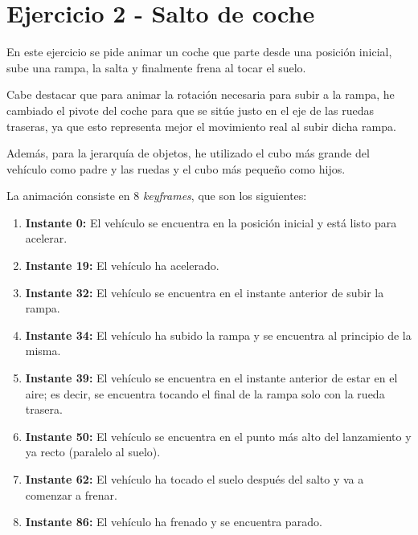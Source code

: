 \documentclass{article}
\begin{document}
\newpage

\section{Ejercicio 2 - Salto de coche}

En este ejercicio se pide animar un coche que parte desde una posición inicial, sube una rampa, la salta y finalmente frena al tocar el suelo.

\bigskip

Cabe destacar que para animar la rotación necesaria para subir a la rampa, he cambiado el pivote del coche para que se sitúe justo en el eje de las ruedas traseras, ya que esto representa mejor el movimiento real al subir dicha rampa.

\bigskip

Además, para la jerarquía de objetos, he utilizado el cubo más grande del vehículo como padre y las ruedas y el cubo más pequeño como hijos.

\bigskip

La animación consiste en 8 \textit{keyframes}, que son los siguientes:

\begin{enumerate}
    \item \textbf{Instante 0:} El vehículo se encuentra en la posición inicial y está listo para acelerar.
    \item \textbf{Instante 19:} El vehículo ha acelerado.
    \item \textbf{Instante 32:} El vehículo se encuentra en el instante anterior de subir la rampa.
    \item \textbf{Instante 34:} El vehículo ha subido la rampa y se encuentra al principio de la misma.
    \item \textbf{Instante 39:} El vehículo se encuentra en el instante anterior de estar en el aire; es decir, se encuentra tocando el final de la rampa solo con la rueda trasera.
    \item \textbf{Instante 50:} El vehículo se encuentra en el punto más alto del lanzamiento y ya recto (paralelo al suelo).
    \item \textbf{Instante 62:} El vehículo ha tocado el suelo después del salto y va a comenzar a frenar.
    \item \textbf{Instante 86:} El vehículo ha frenado y se encuentra parado.
\end{enumerate}

\bigskip
\end{document}
